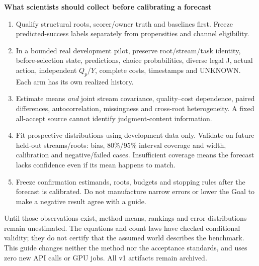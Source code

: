 \documentclass[10pt,a4paper]{article}
\newcommand{\lead}[1]{\vspace{3pt}\textbf{#1}\par}
\begin{document}
\lead{What scientists should collect before calibrating a forecast}
\begin{enumerate}\setlength{\itemsep}{2pt}
\item Qualify structural roots, scorer/owner truth and baselines first. Freeze
  predicted-success labels separately from propensities and channel eligibility.
\item In a bounded real development pilot, preserve root/stream/task identity,
  before-selection state, predictions, choice probabilities, diverse legal J,
  actual action, independent $Q_p/Y$, complete costs, timestamps and UNKNOWN.
  Each arm has its own realized history.
\item Estimate means \emph{and} joint stream covariance, quality--cost dependence,
  paired differences, autocorrelation, missingness and cross-root heterogeneity.
  A fixed all-accept source cannot identify judgment-content information.
\item Fit prospective distributions using development data only. Validate on
  future held-out streams/roots: bias, 80\%/95\% interval coverage and width,
  calibration and negative/failed cases. Insufficient coverage means the forecast
  lacks confidence even if its mean happens to match.
\item Freeze confirmation estimands, roots, budgets and stopping rules after the
  forecast is calibrated. Do not manufacture narrow errors or lower the Goal
  to make a negative result agree with a guide.
\end{enumerate}
Until those observations exist, method means, rankings and error distributions
remain unestimated. The equations and count laws have checked conditional
validity; they do not certify that the assumed world describes the benchmark.
This guide changes neither the method nor the acceptance standards, and uses
zero new API calls or GPU jobs. All v1 artifacts remain archived.
\end{document}
